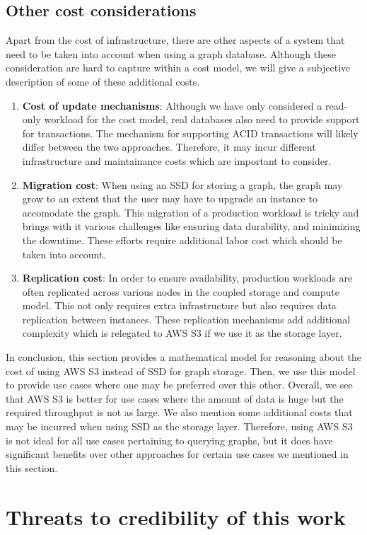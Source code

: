 \subsection{Other cost considerations}
Apart from the cost of infrastructure, there are other aspects of a system that
need to be taken into account when using a graph database. Although these
consideration are hard to capture within a cost model, we will give a subjective
description of some of these additional costs.
\begin{enumerate}
    \item \textbf{Cost of update mechanisms}: Although we have only considered a
        read-only workload for the cost model, real databases also need to
        provide support for transactions. The mechanism for supporting ACID
        transactions will likely differ between the two approaches. Therefore,
        it may incur different infrastructure and maintainance costs which are
        important to consider.
    \item \textbf{Migration cost}: When using an SSD for storing a graph, the
        graph may grow to an extent that the user may have to upgrade an
        instance to accomodate the graph. This migration of a production
        workload is tricky and brings with it various challenges like ensuring
        data durability, and minimizing the downtime. These efforts require
        additional labor cost which should be taken into account.
    \item \textbf{Replication cost}: In order to ensure availability, production
        workloads are often replicated across various nodes in the coupled
        storage and compute model. This not only requires extra infrastructure
        but also requires data replication between instances. These replication
        mechanisms add additional complexity which is relegated to AWS S3 if we
        use it as the storage layer.
\end{enumerate}

\medskip
In conclusion, this section provides a mathematical model for reasoning about
the cost of using AWS S3 instead of SSD for graph storage. Then, we use this
model to provide use cases where one may be preferred over this other. Overall,
we see that AWS S3 is better for use cases where the amount of data is huge but
the required throughput is not as large. We also mention some additional costs
that may be incurred when using SSD as the storage layer. Therefore, using AWS S3 is
not ideal for all use cases pertaining to querying graphs, but it does have
significant benefits over other approaches for certain use cases we mentioned in
this section.

\section{Threats to credibility of this work}\label{sec:threats}
